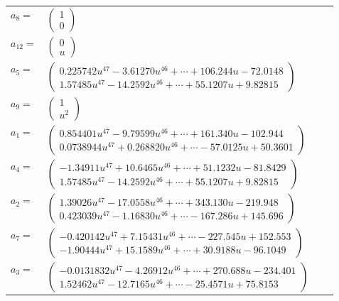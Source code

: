 \documentclass[1p]{elsarticle_modified}
\theoremstyle{definition}
\begin{document}
\begin{tabular}{m{7pt} m{180pt} m{7pt} m{180pt} }
\flushright $a_{8}=$&$\begin{pmatrix}1\\0\end{pmatrix}$ \\
\flushright $a_{12}=$&$\begin{pmatrix}0\\u\end{pmatrix}$ \\
\flushright $a_{5}=$&$\begin{pmatrix}0.225742 u^{47}-3.61270 u^{46}+\cdots+106.244 u-72.0148\\1.57485 u^{47}-14.2592 u^{46}+\cdots+55.1207 u+9.82815\end{pmatrix}$ \\
\flushright $a_{9}=$&$\begin{pmatrix}1\\u^2\end{pmatrix}$ \\
\flushright $a_{1}=$&$\begin{pmatrix}0.854401 u^{47}-9.79599 u^{46}+\cdots+161.340 u-102.944\\0.0738944 u^{47}+0.268820 u^{46}+\cdots-57.0125 u+50.3601\end{pmatrix}$ \\
\flushright $a_{4}=$&$\begin{pmatrix}-1.34911 u^{47}+10.6465 u^{46}+\cdots+51.1232 u-81.8429\\1.57485 u^{47}-14.2592 u^{46}+\cdots+55.1207 u+9.82815\end{pmatrix}$ \\
\flushright $a_{2}=$&$\begin{pmatrix}1.39026 u^{47}-17.0558 u^{46}+\cdots+343.130 u-219.948\\0.423039 u^{47}-1.16830 u^{46}+\cdots-167.286 u+145.696\end{pmatrix}$ \\
\flushright $a_{7}=$&$\begin{pmatrix}-0.420142 u^{47}+7.15431 u^{46}+\cdots-227.545 u+152.553\\-1.90444 u^{47}+15.1589 u^{46}+\cdots+30.9188 u-96.1049\end{pmatrix}$ \\
\flushright $a_{3}=$&$\begin{pmatrix}-0.0131832 u^{47}-4.26912 u^{46}+\cdots+270.688 u-234.401\\1.52462 u^{47}-12.7165 u^{46}+\cdots-25.4571 u+75.8153\end{pmatrix}$ \\

\end{tabular}
\end{document}
